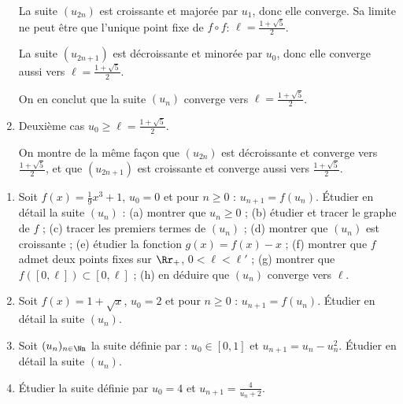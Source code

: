 \documentclass[class=report,crop=false]{standalone}
\begin{document}
\begin{exemple}
\begin{enumerate}
  La suite $(u_{2n})$ est croissante et majorée par $u_1$, donc elle converge. Sa limite ne peut
  être que l'unique point fixe de $f\circ f$: $\ell = \frac{1+\sqrt{5}}{2}$.

   La suite $(u_{2n+1})$ est décroissante et minorée par $u_0$, donc elle converge aussi vers
   $\ell = \frac{1+\sqrt{5}}{2}$.

   On en conclut que la suite $(u_{n})$ converge vers $\ell = \frac{1+\sqrt{5}}{2}$.

  \item Deuxième cas $u_0 \ge \ell = \frac{1+\sqrt{5}}{2}$.

  On montre de la même façon que $(u_{2n})$ est décroissante et converge vers $\frac{1+\sqrt{5}}{2}$,
  et que $(u_{2n+1})$ est croissante et converge aussi vers $\frac{1+\sqrt{5}}{2}$.


\end{enumerate}

\end{exemple}




\begin{miniexercices}
\sauteligne
\begin{enumerate}

  \item Soit $f(x)=\frac19x^3+1$, $u_0=0$ et pour $n\ge0$ :
  $u_{n+1}=f(u_n)$. \'Etudier en détail la suite $(u_n)$ :
(a) montrer que $u_n\ge0$ ;
(b) étudier et tracer le graphe de $f$ ;
(c) tracer les premiers termes de $(u_n)$ ;
(d) montrer que $(u_n)$ est croissante ;
(e) étudier la fonction $g(x)=f(x)-x$ ;
(f) montrer que $f$ admet deux points fixes sur $\Rr_+$, $0 < \ell < \ell'$ ;
(g) montrer que $f([0,\ell]) \subset [0,\ell]$ ;
(h) en déduire que $(u_n)$ converge vers $\ell$.


  \item Soit $f(x)=1+\sqrt{x}$, $u_0= 2$ et pour $n\ge0$ :
  $u_{n+1}=f(u_n)$. \'Etudier en détail la suite $(u_n)$.


  \item Soit $(u_n)_{n\in\Nn}$ la suite définie par :
$u_0 \in[0,1]$ et $u_{n+1} = u_n - u_n^2$. \'Etudier en détail la suite $(u_n)$.

  \item \'Etudier la suite définie par $u_0=4$ et $u_{n+1}=\frac{4}{u_n+2}$.

\end{enumerate}
\end{miniexercices}



\finchapitre
\end{document}
